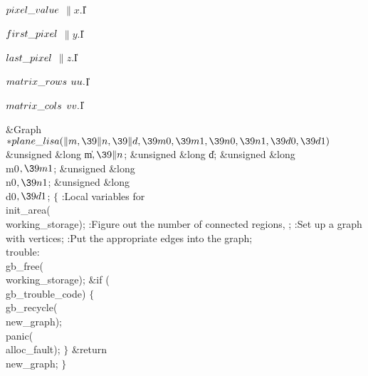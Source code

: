 \Y\B\4\D$\\{pixel\_value}$ \5
$\|x.{}$\|I\par
\B\4\D$\\{first\_pixel}$ \5
$\|y.{}$\|I\par
\B\4\D$\\{last\_pixel}$ \5
$\|z.{}$\|I\par
\B\4\D$\\{matrix\_rows}$ \5
$\\{uu}.{}$\|I\par
\B\4\D$\\{matrix\_cols}$ \5
$\\{vv}.{}$\|I\par
\Y\B\1\1\&{Graph} ${}{*}\\{plane\_lisa}(\|m,\39\|n,\39\|d,\39\\{m0},\39\\{m1},%
\39\\{n0},\39\\{n1},\39\\{d0},\39\\{d1}){}$\6
\&{unsigned} \&{long} \|m${},\39\|n{}$;%
\6
\&{unsigned} \&{long} \|d;\6
\&{unsigned} \&{long} \\{m0}${},\39\\{m1}{}$;\C{ input will be from rows $[\PB{%
\\{m0}}\,.\,.\,\PB{\\{m1}})$ }\6
\&{unsigned} \&{long} \\{n0}${},\39\\{n1}{}$;\C{ and from columns $[\PB{\\{n0}}%
\,.\,.\,\PB{\\{n1}})$ }\6
\&{unsigned} \&{long} \\{d0}${},\39\\{d1}{}$;\2\2\6
${}\{{}$\5
\1:Local variables for \X\7
\\{init\_area}(\\{working\_storage});\6
:Figure out the number of connected regions, \X;\6
:Set up a graph with  vertices\X;\6
:Put the appropriate edges into the graph\X;\6
\4\\{trouble}:\5
\\{gb\_free}(\\{working\_storage});\6
\&{if} (\\{gb\_trouble\_code})\5
${}\{{}$\1\6
\\{gb\_recycle}(\\{new\_graph});\6
\\{panic}(\\{alloc\_fault});\6
\4${}\}{}$\2\6
\&{return} \\{new\_graph};\6
\4${}\}{}$\2\par
\fi

